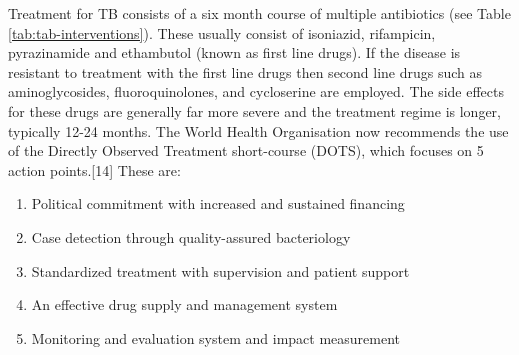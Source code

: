 \documentclass[11pt,twoside]{bristolthesis}
\providecommand{\tightlist}{%
  \setlength{\itemsep}{0pt}\setlength{\parskip}{0pt}}
\begin{document}
  Treatment for TB consists of a six month course of multiple antibiotics (see Table \ref{tab:tab-interventions}). These usually consist of isoniazid, rifampicin, pyrazinamide and ethambutol (known as first line drugs). If the disease is resistant to treatment with the first line drugs then second line drugs such as aminoglycosides, fluoroquinolones, and cycloserine are employed. The side effects for these drugs are generally far more severe and the treatment regime is longer, typically 12-24 months. The World Health Organisation now recommends the use of the Directly Observed Treatment short-course (DOTS), which focuses on 5 action points.{[}14{]} These are:
  \begin{enumerate}
  \def\labelenumi{\arabic{enumi}.}
  \tightlist
  \item
    Political commitment with increased and sustained financing
  \item
    Case detection through quality-assured bacteriology
  \item
    Standardized treatment with supervision and patient support
  \item
    An effective drug supply and management system
  \item
    Monitoring and evaluation system and impact measurement
  \end{enumerate}
\end{document}
